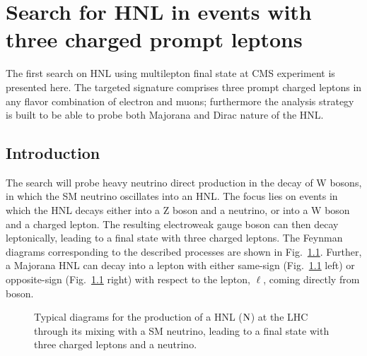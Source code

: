\chapter{Search for HNL in events with three charged prompt
  leptons~\cite{Sirunyan:2018mtv}} \label{Chapter5}
The first search on HNL using multilepton final state at CMS
experiment is presented here. The targeted signature comprises 
three prompt charged leptons in any flavor combination of electron
and muons; furthermore the analysis strategy is built to be able to probe both
Majorana and Dirac nature of the HNL. 

\section{Introduction}
The search will probe heavy neutrino direct production in the decay of W bosons, in which the SM neutrino oscillates into an HNL. The focus lies on events in which the HNL decays either into a Z boson and a neutrino, or into a W boson and a charged lepton. The resulting electroweak gauge boson can then decay leptonically, leading to a final state with three charged leptons. The Feynman diagrams corresponding to the described processes are shown in 
Fig.~\ref{fig:c5hnldiagram}. Further, a Majorana HNL can decay into a lepton with either same-sign (Fig.~\ref{fig:c5hnldiagram} left) 
or opposite-sign (Fig.~\ref{fig:c5hnldiagram} right) with respect to the lepton, $\ell$, coming directly from \PW boson. 
\begin{figure}[h]
\noindent
{}
\caption{Typical diagrams for the production of a HNL ($\mathrm{N}$)  at the LHC 
through its mixing with a SM neutrino, leading to a
final state with three charged leptons and a neutrino.}
\label{fig:c5hnldiagram}
\end{figure}

